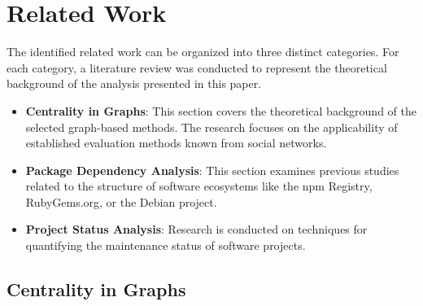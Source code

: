 \section{Related Work}

The identified related work can be organized into three distinct categories.
For each category, a literature review was conducted to represent the theoretical background of the analysis presented in this paper.


\begin{itemize}
	\item \textbf{Centrality in Graphs}: This section covers the theoretical background of the selected graph-based methods. The research focuses on the applicability of established evaluation methods known from social networks.
	\item \textbf{Package Dependency Analysis}: This section examines previous studies related to the structure of software ecosystems like the npm Registry, RubyGems.org, or the Debian project.
	\item \textbf{Project Status Analysis}: Research is conducted on techniques for quantifying the maintenance status of software projects.
\end{itemize}

\subsection{Centrality in Graphs}

